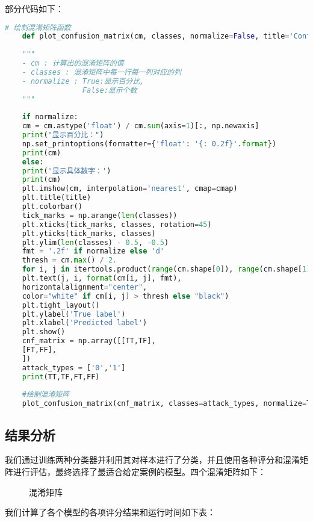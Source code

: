 \documentclass[a4paper,12pt]{article}
\begin{document}
部分代码如下：
\begin{lstlisting}[language=python, breaklines]
	# 绘制混淆矩阵函数
	def plot_confusion_matrix(cm, classes, normalize=False, title='Confusion matrix', cmap=plt.cm.Purples):
	
	"""
	- cm : 计算出的混淆矩阵的值
	- classes : 混淆矩阵中每一行每一列对应的列
	- normalize : True:显示百分比, 
				  False:显示个数
	"""
	
	if normalize:
	cm = cm.astype('float') / cm.sum(axis=1)[:, np.newaxis]
	print("显示百分比：")
	np.set_printoptions(formatter={'float': '{: 0.2f}'.format})
	print(cm)
	else:
	print('显示具体数字：')
	print(cm)
	plt.imshow(cm, interpolation='nearest', cmap=cmap)
	plt.title(title)
	plt.colorbar()
	tick_marks = np.arange(len(classes))
	plt.xticks(tick_marks, classes, rotation=45)
	plt.yticks(tick_marks, classes)
	plt.ylim(len(classes) - 0.5, -0.5)
	fmt = '.2f' if normalize else 'd'
	thresh = cm.max() / 2.
	for i, j in itertools.product(range(cm.shape[0]), range(cm.shape[1])):
	plt.text(j, i, format(cm[i, j], fmt),
	horizontalalignment="center",
	color="white" if cm[i, j] > thresh else "black")
	plt.tight_layout()
	plt.ylabel('True label')
	plt.xlabel('Predicted label')
	plt.show()
	cnf_matrix = np.array([[TT,TF],
	[FT,FF],
	])
	attack_types = ['0','1']
	print(TT,TF,FT,FF)
	
	#绘制混淆矩阵
	plot_confusion_matrix(cnf_matrix, classes=attack_types, normalize=True, title='Normalized confusion matrix')
\end{lstlisting}
\subsection{结果分析}

我们通过训练两种分类器并利用其对样本进行了分类，并且使用各种评分和混淆矩阵进行评估，最终选择了最适合给定案例的模型。四个混淆矩阵如下：
\begin{figure}[htbp]%
	\centering%
	

\caption{混淆矩阵}
\end{figure}
\newpage
我们计算了各个模型的各项评分结果和运行时间如下表：
\end{document}

